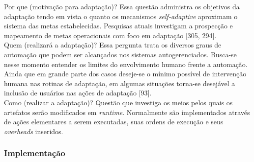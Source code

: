 \documentclass[conference]{IEEEtran}
\begin{document}
Por que (motivação para adaptação)? Essa questão administra os objetivos da adaptação tendo em vista o quanto os mecanismos \textit{self-adaptive} aproximam o sistema das metas estabelecidas. Pesquisas atuais investigam a prospecção e mapeamento de metas operacionais com foco em adaptação [305, 294].\\
Quem (realizará a adaptação)? Essa pergunta trata os diversos graus de automação que podem ser alcançados nos sistemas autogerenciados. Busca-se nesse momento entender os limites do envolvimento humano frente a automação. Ainda que em grande parte dos casos deseje-se o mínimo possível de intervenção humana nas rotinas de adaptação, em algumas situações torna-se desejável a inclusão de usuários nas ações de adaptação [93].\\
Como (realizar a adaptação)? Questão que investiga os meios pelos quais os artefatos serão modificados em \textit{runtime}. Normalmente são implementados através de ações elementares a serem executadas, suas ordens de execução e seus \textit{overheads} inseridos.

\subsubsection{Implementação}
\end{document}
